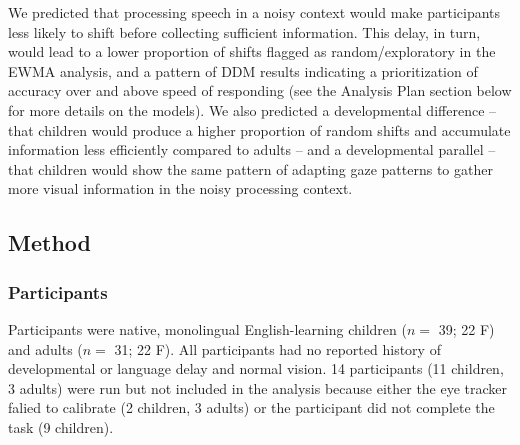 \documentclass[10pt, letterpaper]{article}
\begin{document}
We predicted that processing speech in a noisy context would make
participants less likely to shift before collecting sufficient
information. This delay, in turn, would lead to a lower proportion of
shifts flagged as random/exploratory in the EWMA analysis, and a pattern
of DDM results indicating a prioritization of accuracy over and above
speed of responding (see the Analysis Plan section below for more
details on the models). We also predicted a developmental difference --
that children would produce a higher proportion of random shifts and
accumulate information less efficiently compared to adults -- and a
developmental parallel -- that children would show the same pattern of
adapting gaze patterns to gather more visual information in the noisy
processing context.

\subsection{Method}\label{method}

\subsubsection{Participants}\label{participants}

Participants were native, monolingual English-learning children (\(n=\)
39; 22 F) and adults (\(n=\) 31; 22 F). All participants had no reported
history of developmental or language delay and normal vision. 14
participants (11 children, 3 adults) were run but not included in the
analysis because either the eye tracker falied to calibrate (2 children,
3 adults) or the participant did not complete the task (9 children).
\end{document}
